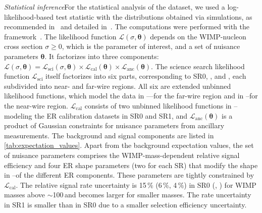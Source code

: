 \documentclass[
    reprint,
    superscriptaddress,
    aps, prl,
    amsmath,amssymb,
    twocolumn,
    showkeys,
    floatfix,
    nofootinbib,
]{revtex4-2}
\begin{document}
\textit{Statistical inference\textemdash}For the statistical analysis of the dataset, we used a log-likelihood-based test statistic with the distributions obtained via \toymc simulations, as recommended in~\cite{Baxter:2021pqo} and detailed in~\cite{XENON:2024ap2}.
The computations were performed with the  framework~\cite{alea}.
The likelihood function $\mathcal{L}(\sigma, \boldsymbol{\theta})$ depends on the WIMP-nucleon cross section $\sigma\geq 0$, which is the parameter of interest, and a set of nuisance parameters $\boldsymbol{\theta}$. It factorizes into three components: $\mathcal{L}(\sigma, \boldsymbol{\theta}) = \mathcal{L}_\mathrm{sci}(\sigma, \boldsymbol{\theta}) \times \mathcal{L}_\mathrm{cal}(\boldsymbol{\theta})\times \mathcal{L}_\mathrm{anc}(\boldsymbol{\theta}).$
The science search likelihood function $\mathcal{L}_\mathrm{sci}$ itself factorizes into six parts, corresponding to SR0, \sronea, and \sroneb, each subdivided into near- and far-wire regions.
All six are extended unbinned likelihood functions, which model the data in \csone--\cstwo--\R for the far-wire region and in \csone--\cstwo for the near-wire region.
$\mathcal{L}_\mathrm{cal}$ consists of two unbinned likelihood functions in \csone--\cstwo modeling the ER calibration datasets in SR0 and SR1, and $\mathcal{L}_\mathrm{anc}(\boldsymbol{\theta})$ is a product of Gaussian constraints for nuisance parameters from ancillary measurements.
The background and signal components are listed in \cref{tab:expectation_values}.
Apart from the background expectation values, the set of nuisance parameters comprises the WIMP-mass-dependent relative signal efficiency and four ER shape parameters (two for each SR) that modify the shape in \csone--\cstwo of the different ER components. 
These parameters are tightly constrained by $\mathcal{L}_\mathrm{cal}$.
The relative signal rate uncertainty is 15\,\% (6\,\%, 4\,\%) in SR0 (\sronea, \sroneb) for WIMP masses above $\sim$100\,\gevcc and becomes larger for smaller masses.
The rate uncertainty in SR1 is smaller than in SR0 due to a smaller selection efficiency uncertainty.
\end{document}
